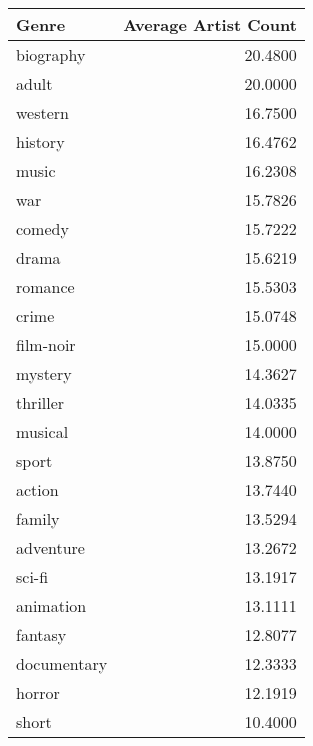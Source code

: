 \begin{tabular}{lr}
\toprule
Genre & Average Artist Count \\
\midrule
biography & 20.4800 \\
adult & 20.0000 \\
western & 16.7500 \\
history & 16.4762 \\
music & 16.2308 \\
war & 15.7826 \\
comedy & 15.7222 \\
drama & 15.6219 \\
romance & 15.5303 \\
crime & 15.0748 \\
film-noir & 15.0000 \\
mystery & 14.3627 \\
thriller & 14.0335 \\
musical & 14.0000 \\
sport & 13.8750 \\
action & 13.7440 \\
family & 13.5294 \\
adventure & 13.2672 \\
sci-fi & 13.1917 \\
animation & 13.1111 \\
fantasy & 12.8077 \\
documentary & 12.3333 \\
horror & 12.1919 \\
short & 10.4000 \\
\bottomrule
\end{tabular}
